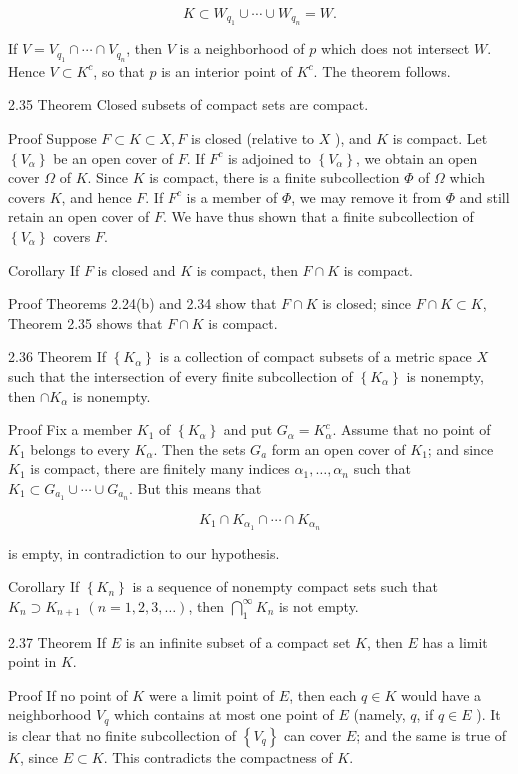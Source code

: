\documentclass[10pt]{article}
\begin{document}
$$
K \subset W_{q_{1}} \cup \cdots \cup W_{q_{n}}=W .
$$

If $V=V_{q_{1}} \cap \cdots \cap V_{q_{n}}$, then $V$ is a neighborhood of $p$ which does not intersect $W$. Hence $V \subset K^{c}$, so that $p$ is an interior point of $K^{c}$. The theorem follows.

2.35 Theorem Closed subsets of compact sets are compact.

Proof Suppose $F \subset K \subset X, F$ is closed (relative to $X$ ), and $K$ is compact. Let $\left\{V_{\alpha}\right\}$ be an open cover of $F$. If $F^{c}$ is adjoined to $\left\{V_{\alpha}\right\}$, we obtain an
open cover $\Omega$ of $K$. Since $K$ is compact, there is a finite subcollection $\Phi$ of $\Omega$ which covers $K$, and hence $F$. If $F^{c}$ is a member of $\Phi$, we may remove it from $\Phi$ and still retain an open cover of $F$. We have thus shown that a finite subcollection of $\left\{V_{\alpha}\right\}$ covers $F$.

Corollary If $F$ is closed and $K$ is compact, then $F \cap K$ is compact.

Proof Theorems 2.24(b) and 2.34 show that $F \cap K$ is closed; since $F \cap K \subset K$, Theorem 2.35 shows that $F \cap K$ is compact.

2.36 Theorem If $\left\{K_{\alpha}\right\}$ is a collection of compact subsets of a metric space $X$ such that the intersection of every finite subcollection of $\left\{K_{\alpha}\right\}$ is nonempty, then $\cap K_{\alpha}$ is nonempty.

Proof Fix a member $K_{1}$ of $\left\{K_{\alpha}\right\}$ and put $G_{\alpha}=K_{\alpha}^{c}$. Assume that no point of $K_{1}$ belongs to every $K_{\alpha}$. Then the sets $G_{a}$ form an open cover of $K_{1}$; and since $K_{1}$ is compact, there are finitely many indices $\alpha_{1}, \ldots, \alpha_{n}$ such that $K_{1} \subset G_{a_{1}} \cup \cdots \cup G_{a_{n}}$. But this means that

$$
K_{1} \cap K_{\alpha_{1}} \cap \cdots \cap K_{\alpha_{n}}
$$

is empty, in contradiction to our hypothesis.

Corollary If $\left\{K_{n}\right\}$ is a sequence of nonempty compact sets such that $K_{n} \supset K_{n+1}$ $(n=1,2,3, \ldots)$, then $\bigcap_{1}^{\infty} K_{n}$ is not empty.

2.37 Theorem If $E$ is an infinite subset of a compact set $K$, then $E$ has a limit point in $K$.

Proof If no point of $K$ were a limit point of $E$, then each $q \in K$ would have a neighborhood $V_{q}$ which contains at most one point of $E$ (namely, $q$, if $q \in E$ ). It is clear that no finite subcollection of $\left\{V_{q}\right\}$ can cover $E$; and the same is true of $K$, since $E \subset K$. This contradicts the compactness of $K$.
\end{document}
